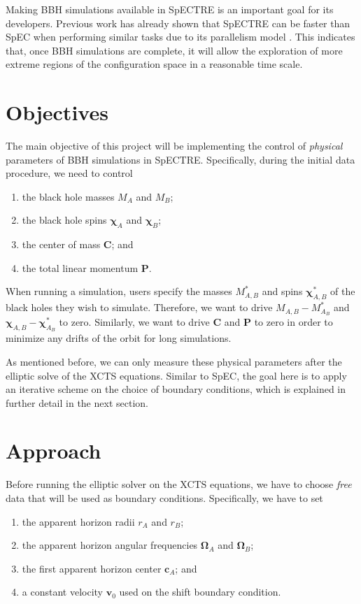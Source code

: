 \documentclass{../letter}
\renewcommand{\v}[1]{\boldsymbol{#1}}
\begin{document}
	Making BBH simulations available in SpECTRE is an important goal for its developers. Previous work has already shown that SpECTRE can be faster than SpEC when performing similar tasks due to its parallelism model \cite{Vu}. This indicates that, once BBH simulations are complete, it will allow the exploration of more extreme regions of the configuration space in a reasonable time scale.

	\section{Objectives}

	The main objective of this project will be implementing the control of \textit{physical} parameters of BBH simulations in SpECTRE. Specifically, during the initial data procedure, we need to control
	\begin{enumerate}
		\item the black hole masses $M_A$ and $M_B$;
		\item the black hole spins $\v \chi_A$ and $\v \chi_B$;
		\item the center of mass $\v C$; and
		\item the total linear momentum $\v P$.
	\end{enumerate}
	
	When running a simulation, users specify the masses $M_{A,B}^*$ and spins $\v \chi_{A,B}^*$ of the black holes they wish to simulate. Therefore, we want to drive $M_{A,B} - M_{A_B}^*$ and $\v \chi_{A,B} - \v \chi_{A_B}^*$ to zero. Similarly, we want to drive $\v C$ and $\v P$ to zero in order to minimize any drifts of the orbit for long simulations.
	
	As mentioned before, we can only measure these physical parameters after the elliptic solve of the XCTS equations. Similar to SpEC, the goal here is to apply an iterative scheme on the choice of boundary conditions, which is explained in further detail in the next section.

	\section{Approach}

	
	Before running the elliptic solver on the XCTS equations, we have to choose \textit{free} data that will be used as boundary conditions. Specifically, we have to set
	\begin{enumerate}
		\item the apparent horizon radii $r_A$ and $r_B$;
		\item the apparent horizon angular frequencies $\v \Omega_A$ and $\v \Omega_B$;
		\item the first apparent horizon center $\v c_A$; and
		\item a constant velocity $\v v_0$ used on the shift boundary condition.
	\end{enumerate}
\end{document}
